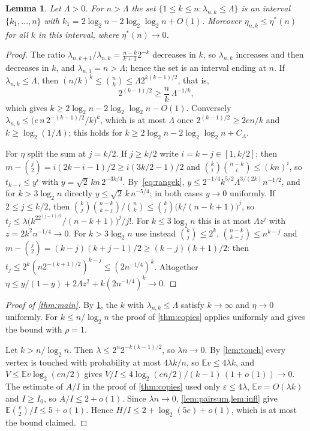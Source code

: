 \documentclass[11pt]{amsart}
\newtheorem{lemma}[theorem]{Lemma}
\theoremstyle{remark}
\newcommand{\E}{\mathbb{E}}
\newcommand{\eps}{\varepsilon}
\begin{document}
\begin{lemma}\label{lem:range}
Let $\Lambda>0$. For $n>\Lambda$ the set $\{1\le k\le n:\lambda_{n,k}\le\Lambda\}$ is an interval $\{k_1,\dots,n\}$
with $k_1=2\log_2n-2\log_2\log_2n+O(1)$. Moreover $\eta_{n,k}\le\eta^*(n)$ for all $k$ in this interval, where
$\eta^*(n)\to0$.
\end{lemma}

\begin{proof}
The ratio $\lambda_{n,k+1}/\lambda_{n,k}=\frac{n-k}{k+1}2^{-k}$ decreases in $k$, so $\lambda_{n,k}$ increases and then
decreases in $k$, and $\lambda_{n,1}=n>\Lambda$; hence the set is an interval ending at $n$. If $\lambda_{n,k}\le\Lambda$,
then $(n/k)^k\le\binom nk\le\Lambda2^{k(k-1)/2}$, that is,
\begin{equation}\label{eq:rangek}
2^{(k-1)/2}\ge\frac nk\,\Lambda^{-1/k},
\end{equation}
which gives $k\ge2\log_2n-2\log_2\log_2n-O(1)$. Conversely $\lambda_{n,k}\le\bigl(e\,n\,2^{-(k-1)/2}/k\bigr)^k$, which is at
most $\Lambda$ once $2^{(k-1)/2}\ge2en/k$ and $k\ge\log_2(1/\Lambda)$; this holds for
$k\ge2\log_2n-2\log_2\log_2n+C_\Lambda$.

For $\eta$ split the sum at $j=k/2$. If $j\ge k/2$ write $i=k-j\in[1,k/2]$; then $m-\binom
j2=i(2k-i-1)/2\ge i(3k/2-1)/2$ and $\binom ki\binom{n-k}i\le(kn)^i$, so $t_{k-i}\le y^i$ with
$y=\sqrt2\,kn\,2^{-3k/4}$. By~\eqref{eq:rangek}, $y\le2^{-1/4}k^{5/2}\Lambda^{3/(2k)}n^{-1/2}$, and for $k>3\log_2n$
directly $y\le\sqrt2\,k\,n^{-5/4}$; in both cases $y\to0$ uniformly. If $2\le j\le k/2$, then
$\binom kj\binom{n-k}{k-j}/\binom nk\le\binom kj\bigl(k/(n-k+1)\bigr)^j$, so
$t_j\le\lambda\bigl(k^22^{(j-1)/2}/(n-k+1)\bigr)^j/j!$. For $k\le3\log_2n$ this is at most $\Lambda z^j$ with
$z=2k^2n^{-1/4}\to0$. For $k>3\log_2n$ use instead $\binom kj\le2^k$, $\binom{n-k}{k-j}\le n^{k-j}$ and
$m-\binom j2=(k-j)(k+j-1)/2\ge(k-j)(k+1)/2$: then $t_j\le2^k(n2^{-(k+1)/2})^{k-j}\le(2n^{-1/4})^k$. Altogether
$\eta\le y/(1-y)+2\Lambda z^2+k(2n^{-1/4})^k\to0$.
\end{proof}

\begin{proof}[Proof of \cref{thm:main}]
By \cref{lem:range}, the $k$ with $\lambda_{n,k}\le\Lambda$ satisfy $k\to\infty$ and $\eta\to0$ uniformly. For
$k\le n/\log_2n$ the proof of \cref{thm:copies} applies uniformly and gives the bound with $\rho=1$.

Let $k>n/\log_2n$. Then $\lambda\le2^n2^{-k(k-1)/2}$, so $\lambda n\to0$. By \cref{lem:touch} every vertex is touched
with probability at most $4\lambda k/n$, so $\E v\le4\lambda k$, and $V\le\E v\log_2(en/2)$ gives
$V/I\le4\log_2(en/2)/(k-1)\,(1+o(1))\to0$. The estimate of $A/I$ in the proof of \cref{thm:copies} used only
$\eps\le4\lambda$, $\E v=O(\lambda k)$ and $I\ge I_0$, so $A/I\le2+o(1)$. Since $\lambda n\to0$,
\cref{lem:pairsum,lem:infl} give $\E\binom v2/I\le5+o(1)$. Hence $H/I\le2+\log_2(5e)+o(1)$, which is at most the bound
claimed.
\end{proof}
\end{document}
